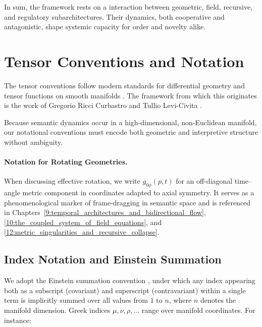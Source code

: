 In sum, the framework rests on a interaction between geometric, field, recursive, and regulatory subarchitectures. Their dynamics, both cooperative and antagonistic, shape systemic capacity for order and novelty alike.


\section{Tensor Conventions and Notation}
\label{2.4:tensor_conventions_and_notation}

The tensor conventions follow modern standards for differential geometry and tensor functions on smooth manifolds \autocite{Lee2012, MisnerThorneWheeler1973}. The framework from which this originates is the work of Gregorio Ricci Curbastro and Tullio Levi-Civita \autocite{RicciLeviCivita1901}.

Because semantic dynamics occur in a high-dimensional, non-Euclidean manifold, our notational conventions must encode both geometric and interpretive structure without ambiguity.

\paragraph{Notation for Rotating Geometries.} When discussing effective rotation, we write \(g_{0\phi}(p,t)\) for an off-diagonal time–angle metric component in coordinates adapted to axial symmetry. It serves as a phenomenological marker of frame-dragging in semantic space and is referenced in Chapters~\ref{9:temporal_architectures_and_bidirectional_flow}, \ref{10:the_coupled_system_of_field_equations}, and \ref{12:metric_singularities_and_recursive_collapse}.


\subsection{Index Notation and Einstein Summation}
\label{2.4.1:index_notation_and_einstein_summation}

We adopt the Einstein summation convention \autocite{Einstein1916}, under which any index appearing both as a subscript (covariant) and superscript (contravariant) within a single term is implicitly summed over all values from \(1\) to \(n\), where \(n\) denotes the manifold dimension. Greek indices \(\mu,\nu,\rho,\ldots\) range over manifold coordinates. For instance:


